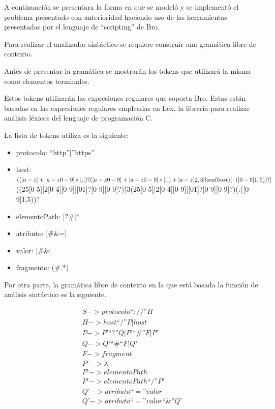 A continuación se presentara la forma en que se modeló y se implementó el problema presentado con anterioridad haciendo uso de las herramientas presentadas por el lenguaje de ``scripting'' de Bro.

Para realizar el analizador sintáctico se requiere construir una gramática libre de contexto.

Antes de presentar la gramática se mostrarán los tokens que utilizará la misma como elementos terminales.

Estos tokens utilizarán las expresiones regulares que soporta Bro. Estas están basadas en las expresiones regulares empleadas en Lex, la librería para realizar análisis léxicos del lenguaje de programación C.

La lista de tokens utiliza es la siguiente:

\begin{itemize}
\item protocolo: “http”|”https”
\item host: $(([a-z]+[a-z0-9\-]*[.])?([a-z0-9]+[a-z0-9\-]*[.])+[a-z]{2,3}|localhost)(:([0-9]{1,5}))?|$\\ ((25[0-5]|2[0-4][0-9]|[01]?[0-9][0-9]?)\.){3}(25[0-5]|2[0-4][0-9]|[01]?[0-9][0-9]?)(:([0-9]{1,5}))?
\item elementoPath: [\^?\#]*
\item atributo: [\^\#\&=]
\item valor: [\^\#\&]
\item fragmento: (\#.*)
\end{itemize}

Por otra parte, la gramática libre de contexto en la que está basada la función de análisis sintáctico es la siguiente.

\begin{equation}\label{eq:gramatica}
\begin{aligned}
S -> protocolo “ :// ” H  \\
H -> host “/” P | host \\
P -> P’ “?” Q | P’ “\#” F | P’ \\
Q -> Q’ “\#“ F | Q’ \\
F -> fragment \\
P’ -> \lambda \\
P’ ->  elementoPath \\
P’ -> elementoPath “/” P’ \\
Q’ -> atributo “=” valor \\
Q’ -> atributo “=” valor “\&” Q’ \\
\end{aligned}
\end{equation}

